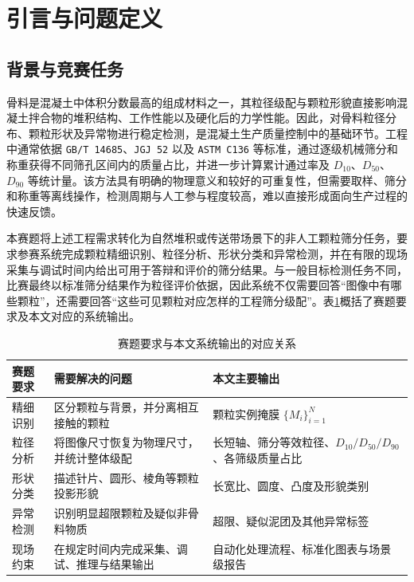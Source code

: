\section{引言与问题定义}
\label{sec:introduction}

\subsection{背景与竞赛任务}
\label{sec:task-background}

骨料是混凝土中体积分数最高的组成材料之一，其粒径级配与颗粒形貌直接影响混凝土拌合物的堆积结构、工作性能以及硬化后的力学性能。因此，对骨料粒径分布、颗粒形状及异常物进行稳定检测，是混凝土生产质量控制中的基础环节。工程中通常依据 \texttt{GB/T 14685}、\texttt{JGJ 52} 以及 \texttt{ASTM C136} 等标准，通过逐级机械筛分和称重获得不同筛孔区间内的质量占比，并进一步计算累计通过率及 $D_{10}$、$D_{50}$、$D_{90}$ 等统计量\cite{gb14685-2022,jgj52-2006}。该方法具有明确的物理意义和较好的可重复性，但需要取样、筛分和称重等离线操作，检测周期与人工参与程度较高，难以直接形成面向生产过程的快速反馈。

本赛题将上述工程需求转化为自然堆积或传送带场景下的非人工颗粒筛分任务，要求参赛系统完成颗粒精细识别、粒径分析、形状分类和异常检测，并在有限的现场采集与调试时间内给出可用于答辩和评价的筛分结果。与一般目标检测任务不同，比赛最终以标准筛分结果作为粒径评价依据，因此系统不仅需要回答“图像中有哪些颗粒”，还需要回答“这些可见颗粒对应怎样的工程筛分级配”。表\ref{tab:competition-tasks}概括了赛题要求及本文对应的系统输出。

\begin{table}[htbp]
\centering
\caption{赛题要求与本文系统输出的对应关系}
\label{tab:competition-tasks}
\small
\begin{tabular}{>{\raggedright\arraybackslash}p{2.2cm}>{\raggedright\arraybackslash}p{5.0cm}>{\raggedright\arraybackslash}p{6.0cm}}
\toprule
赛题要求 & 需要解决的问题 & 本文主要输出 \\
\midrule
精细识别 & 区分颗粒与背景，并分离相互接触的颗粒 & 颗粒实例掩膜 $\{M_i\}_{i=1}^{N}$ \\
粒径分析 & 将图像尺寸恢复为物理尺寸，并统计整体级配 & 长短轴、筛分等效粒径、$D_{10}/D_{50}/D_{90}$、各筛级质量占比 \\
形状分类 & 描述针片、圆形、棱角等颗粒投影形貌 & 长宽比、圆度、凸度及形貌类别 \\
异常检测 & 识别明显超限颗粒及疑似非骨料物质 & 超限、疑似泥团及其他异常标签 \\
现场约束 & 在规定时间内完成采集、调试、推理与结果输出 & 自动化处理流程、标准化图表与场景级报告 \\
\bottomrule
\end{tabular}
\end{table}

